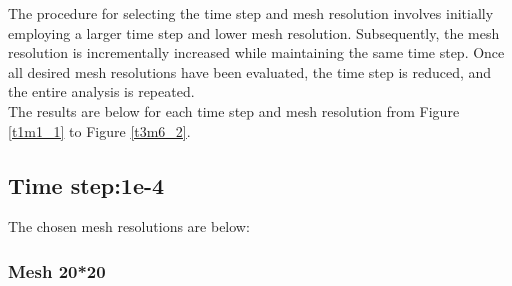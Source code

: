 \documentclass{article}
\begin{document}
The procedure for selecting the time step and mesh resolution involves initially employing a larger time step and lower mesh resolution. Subsequently, the mesh resolution is incrementally increased while maintaining the same time step. Once all desired mesh resolutions have been evaluated, the time step is reduced, and the entire analysis is repeated. \\

The results are below for each time step and mesh resolution from Figure \ref{t1m1_1} to Figure \ref{t3m6_2}.


\clearpage
\subsection{Time step:1e-4}

The chosen mesh resolutions are below: 

\subsubsection{Mesh 20*20}
\end{document}
